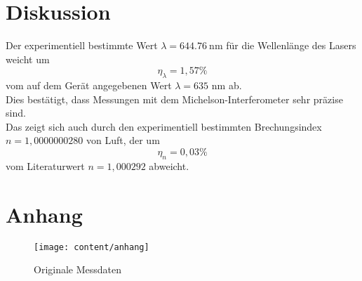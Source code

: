 \section{Diskussion}
\label{sec:Diskussion}

Der experimentiell bestimmte Wert $\lambda = \SI{644,76}{\nano\metre}$ für die Wellenlänge des Lasers weicht um 
\begin{equation*}
    \eta_\lambda = 1,57\%
\end{equation*}
vom auf dem Gerät angegebenen Wert $\lambda = 635$ nm ab. \\
Dies bestätigt, dass Messungen mit dem Michelson-Interferometer sehr präzise sind.\\
Das zeigt sich auch durch den experimentiell bestimmten Brechungsindex $n = 1,0000000280$ von Luft, der um 
\begin{equation*}
    \eta_n = 0,03\%
\end{equation*}
vom Literaturwert $n = 1,000292$ abweicht.\\


\section{Anhang}

\begin{figure}[H]
  \centering
  \texttt{[image: content/anhang]}
  \caption{Originale Messdaten}
  \label{fig:anh}
\end{figure}
